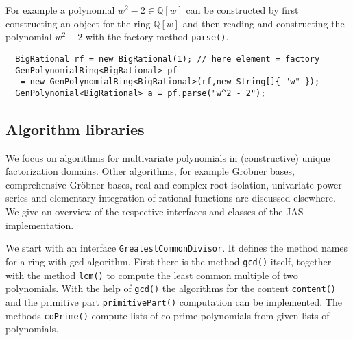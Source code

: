 \documentclass{llncs}
\newcommand{\code}[1]{\texttt{#1}}
\begin{document}
For example a polynomial $w^2 - 2 \in \mathbb{Q}[w]$ can be
constructed by first constructing an object for the ring
$\mathbb{Q}[w]$ and then reading and constructing the polynomial $w^2
- 2$ with the factory method \code{parse()}.
{\small
\begin{verbatim}
  BigRational rf = new BigRational(1); // here element = factory
  GenPolynomialRing<BigRational> pf 
   = new GenPolynomialRing<BigRational>(rf,new String[]{ "w" });
  GenPolynomial<BigRational> a = pf.parse("w^2 - 2");
\end{verbatim}
}


\subsection{Algorithm libraries} %
\label{sec:algo}

We focus on algorithms for multivariate polynomials in (constructive)
unique factorization do\-mains.  Other algorithms, for example Gr\"ob\-ner
bases, comprehensive Gr\"obner bases, real and complex root isolation,
univariate power series and elementary integration of rational
functions are discussed elsewhere. %
%
We give an overview of the respective interfaces and classes of the JAS
implementation. 

We start with an interface \code{Greatest\-Common\-Divisor}.  It
defines the method names for a ring with gcd algorithm.  First there
is the method \code{gcd()} itself, together with the method
\code{lcm()} to compute the least common multiple of two polynomials.
With the help of \code{gcd()} the algorithms for the content
\code{con\-tent()} and the primitive part \code{primitive\-Part()}
computation can be implemented.
%
The methods \code{coPrime()} compute lists of
co-prime polynomials from given lists of polynomials.

\end{document}
